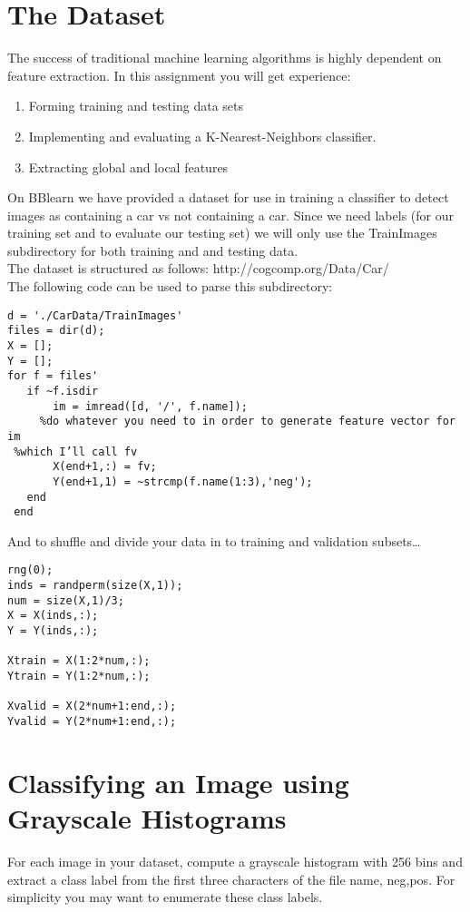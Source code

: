 \documentclass[12pt]{article}
\begin{document}
\newpage
\section*{The Dataset}
The success of traditional machine learning algorithms is highly dependent on feature extraction.  In this assignment you will get experience:
\begin{enumerate}
\item Forming training and testing data sets
\item Implementing and evaluating a K-Nearest-Neighbors classifier.
\item Extracting global and local features
\end{enumerate}

\noindent
On BBlearn we have provided a dataset for use in training a classifier to detect images as containing a car vs not containing a car.  Since we need labels (for our training set and to evaluate our testing set) we will only use the TrainImages subdirectory for both training and and testing data.\\
 
\noindent
The dataset is structured as follows: http://cogcomp.org/Data/Car/ \\

\noindent
The following code can be used to parse this subdirectory:

\begin{verbatim}
d = './CarData/TrainImages'
files = dir(d);
X = [];
Y = [];
for f = files'
   if ~f.isdir
       im = imread([d, '/', f.name]);
	 %do whatever you need to in order to generate feature vector for im
 %which I’ll call fv
       X(end+1,:) = fv;
       Y(end+1,1) = ~strcmp(f.name(1:3),'neg');
   end     
 end
\end{verbatim}

\noindent
And to shuffle and divide your data in to training and validation subsets…

\begin{verbatim}
rng(0);
inds = randperm(size(X,1));
num = size(X,1)/3;
X = X(inds,:);
Y = Y(inds,:);
 
Xtrain = X(1:2*num,:);
Ytrain = Y(1:2*num,:);
 
Xvalid = X(2*num+1:end,:);
Yvalid = Y(2*num+1:end,:);
\end{verbatim}

\newpage
\section{Classifying an Image using Grayscale Histograms}
For each image in your dataset, compute a grayscale histogram with 256 bins and extract a class label from the first three characters of the file name, {neg,pos}.  For simplicity you may want to enumerate these class labels.\\
\end{document}
